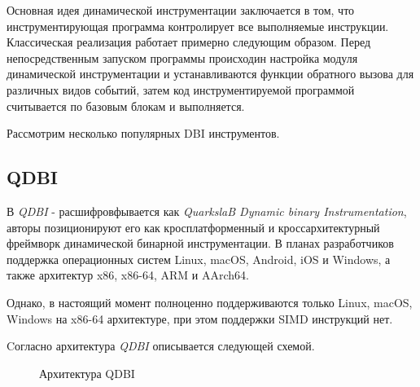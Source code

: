 Основная идея динамической инструментации заключается в том, что инструментирующая программа контролирует все выполняемые инструкции. Классическая реализация работает примерно следующим образом. Перед непосредственным запуском программы происходин настройка модуля динамической инструментации и устанавливаются функции обратного вызова для различных видов событий, затем код инструментируемой программой считывается по базовым блокам и выполняется.

Рассмотрим несколько популярных DBI инструментов.

\subsection{QDBI}

В \cite{QDBI} \emph{QDBI} - расшифровфывается как \emph{QuarkslaB Dynamic binary Instrumentation}, авторы позиционируют его как кросплатформенный и кроссархитектурный фреймворк динамической бинарной инструментации. В планах разработчиков поддержка операционных систем Linux, macOS, Android, iOS и Windows, а также архитектур  x86, x86-64, ARM и AArch64.

Однако, в настоящий момент полноценно поддерживаются только Linux, macOS, Windows на x86-64 архитектуре, при этом поддержки SIMD инструкций нет.

Cогласно \cite{QDBI} архитектура \emph{QDBI} описывается следующей схемой.
\begin{figure}[H]
    \caption{Архитектура QDBI}
    \label{fig:qdbi}
\end{figure}

